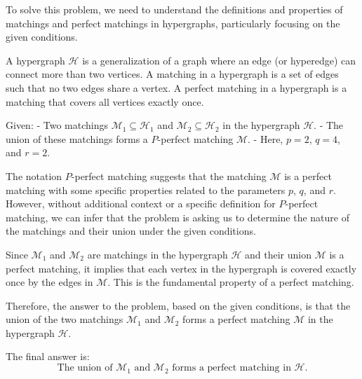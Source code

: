 To solve this problem, we need to understand the definitions and properties of matchings and perfect matchings in hypergraphs, particularly focusing on the given conditions.

A hypergraph \( \mathcal{H} \) is a generalization of a graph where an edge (or hyperedge) can connect more than two vertices. A matching in a hypergraph is a set of edges such that no two edges share a vertex. A perfect matching in a hypergraph is a matching that covers all vertices exactly once.

Given:
- Two matchings \( \mathcal{M}_1 \subseteq \mathcal{H}_1 \) and \( \mathcal{M}_2 \subseteq \mathcal{H}_2 \) in the hypergraph \( \mathcal{H} \).
- The union of these matchings forms a \( P \)-perfect matching \( \mathcal{M} \).
- Here, \( p = 2 \), \( q = 4 \), and \( r = 2 \).

The notation \( P \)-perfect matching suggests that the matching \( \mathcal{M} \) is a perfect matching with some specific properties related to the parameters \( p \), \( q \), and \( r \). However, without additional context or a specific definition for \( P \)-perfect matching, we can infer that the problem is asking us to determine the nature of the matchings and their union under the given conditions.

Since \( \mathcal{M}_1 \) and \( \mathcal{M}_2 \) are matchings in the hypergraph \( \mathcal{H} \) and their union \( \mathcal{M} \) is a perfect matching, it implies that each vertex in the hypergraph is covered exactly once by the edges in \( \mathcal{M} \). This is the fundamental property of a perfect matching.

Therefore, the answer to the problem, based on the given conditions, is that the union of the two matchings \( \mathcal{M}_1 \) and \( \mathcal{M}_2 \) forms a perfect matching \( \mathcal{M} \) in the hypergraph \( \mathcal{H} \).

The final answer is:
\[
\boxed{\text{The union of } \mathcal{M}_1 \text{ and } \mathcal{M}_2 \text{ forms a perfect matching in } \mathcal{H}.}
\]